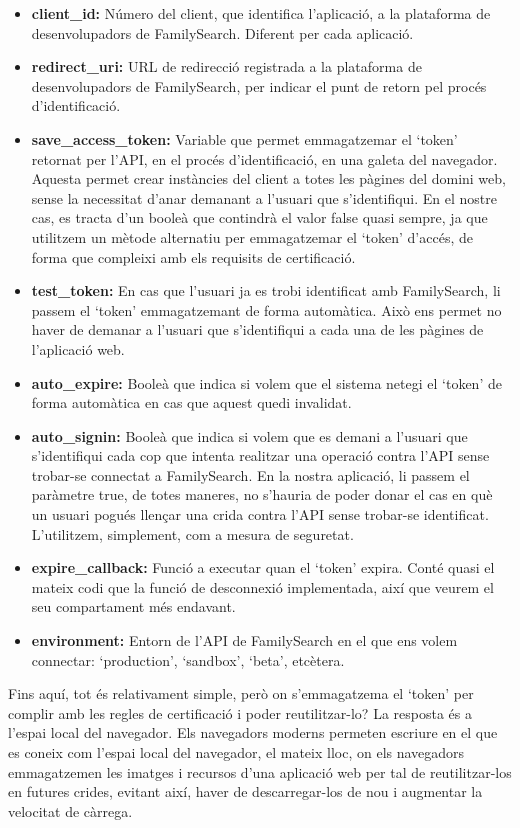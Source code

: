 \begin{itemize}
    \item \textbf{client\_id:} Número del client, que identifica l'aplicació, a la plataforma de desenvolupadors de FamilySearch. Diferent per cada aplicació.
    \item \textbf{redirect\_uri:} URL de redirecció registrada a la plataforma de desenvolupadors de FamilySearch, per indicar el punt de retorn pel procés d'identificació.
    \item \textbf{save\_access\_token:} Variable que permet emmagatzemar el `token' retornat per l'API, en el procés d'identificació, en una galeta del navegador. Aquesta permet crear instàncies del client a totes les pàgines del domini web, sense la necessitat d'anar demanant a l'usuari que s'identifiqui. En el nostre cas, es tracta d'un booleà que contindrà el valor false quasi sempre, ja que utilitzem un mètode alternatiu per emmagatzemar el `token' d'accés, de forma que compleixi amb els requisits de certificació.
    \item \textbf{test\_token:} En cas que l'usuari ja es trobi identificat amb FamilySearch, li passem el `token' emmagatzemant de forma automàtica. Això ens permet no haver de demanar a l'usuari que s'identifiqui a cada una de les pàgines de l'aplicació web.
    \item \textbf{auto\_expire:} Booleà que indica si volem que el sistema netegi el `token' de forma automàtica en cas que aquest quedi invalidat.
    \item \textbf{auto\_signin:} Booleà que indica si volem que es demani a l'usuari que s'identifiqui cada cop que intenta realitzar una operació contra l'API sense trobar-se connectat a FamilySearch. En la nostra aplicació, li passem el paràmetre true, de totes maneres, no s'hauria de poder donar el cas en què un usuari pogués llençar una crida contra l'API sense trobar-se identificat. L'utilitzem, simplement, com a mesura de seguretat.
    \item \textbf{expire\_callback:} Funció a executar quan el `token' expira. Conté quasi el mateix codi que la funció de desconnexió implementada, així que veurem el seu compartament més endavant.
    \item \textbf{environment:} Entorn de l'API de FamilySearch en el que ens volem connectar: `production', `sandbox', `beta', etcètera.
\end{itemize}

Fins aquí, tot és relativament simple, però on s'emmagatzema el `token' per complir amb les regles de certificació i poder reutilitzar-lo? La resposta és a l'espai local del navegador. Els navegadors moderns permeten escriure en el que es coneix com l'espai local del navegador, el mateix lloc, on els navegadors emmagatzemen les imatges i recursos d'una aplicació web per tal de reutilitzar-los en futures crides, evitant així, haver de descarregar-los de nou i augmentar la velocitat de càrrega.

